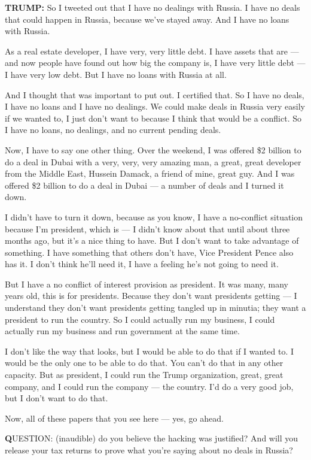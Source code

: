 \textbf{TRUMP:} So I tweeted out that I have no dealings with Russia. I
have no deals that could happen in Russia, because we've stayed away.
And I have no loans with Russia.

As a real estate developer, I have very, very little debt. I have assets
that are --- and now people have found out how big the company is, I
have very little debt --- I have very low debt. But I have no loans with
Russia at all.

And I thought that was important to put out. I certified that. So I have
no deals, I have no loans and I have no dealings. We could make deals in
Russia very easily if we wanted to, I just don't want to because I think
that would be a conflict. So I have no loans, no dealings, and no
current pending deals.

Now, I have to say one other thing. Over the weekend, I was offered \$2
billion to do a deal in Dubai with a very, very, very amazing man, a
great, great developer from the Middle East, Hussein Damack, a friend of
mine, great guy. And I was offered \$2 billion to do a deal in Dubai ---
a number of deals and I turned it down.

I didn't have to turn it down, because as you know, I have a no-conflict
situation because I'm president, which is --- I didn't know about that
until about three months ago, but it's a nice thing to have. But I don't
want to take advantage of something. I have something that others don't
have, Vice President Pence also has it. I don't think he'll need it, I
have a feeling he's not going to need it.

But I have a no conflict of interest provision as president. It was
many, many years old, this is for presidents. Because they don't want
presidents getting --- I understand they don't want presidents getting
tangled up in minutia; they want a president to run the country. So I
could actually run my business, I could actually run my business and run
government at the same time.

I don't like the way that looks, but I would be able to do that if I
wanted to. I would be the only one to be able to do that. You can't do
that in any other capacity. But as president, I could run the Trump
organization, great, great company, and I could run the company --- the
country. I'd do a very good job, but I don't want to do that.

Now, all of these papers that you see here --- yes, go ahead.

\textbf{Q}UESTION: (inaudible) do you believe the hacking was justified?
And will you release your tax returns to prove what you're saying about
no deals in Russia?

